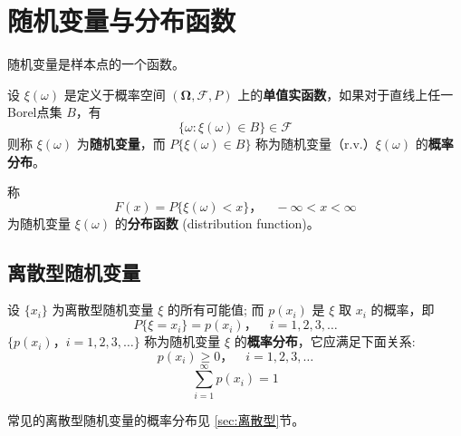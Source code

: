 \section{随机变量与分布函数}\label{sec:rvandcdf}
随机变量是样本点的一个函数。
\begin{definition}[随机变量] \label{def:random_variable}
设 $\xi(\omega)$ 是定义于概率空间 $(\boldsymbol{\Omega},\mathcal{F},P)$ 上的\textbf{单值实函数}，如果对于直线上任一Borel点集 $B$，有
\begin{equation} \label{eq:measurable_function_condition}
\{\omega:\xi(\omega) \in B\} \in \mathcal{F}
\end{equation}
则称 $\xi(\omega)$ 为\textbf{随机变量}，而 $P\{\xi(\omega) \in B\}$ 称为随机变量（r.v.）$\xi(\omega)$ 的\textbf{概率分布}。
\end{definition}
\begin{definition}[分布函数] \label{def:distribution_function}
称
\begin{equation} \label{eq:distribution_function_formula}
F(x) = P\{\xi(\omega) < x\}，\quad -\infty < x < \infty
\end{equation}
为随机变量 $\xi(\omega)$ 的\textbf{分布函数} (distribution function)。
\end{definition}
\subsection{离散型随机变量}
\begin{definition}[概率分布]\label{def:概率分布}
    设 $\{x_i\}$ 为离散型随机变量 $\xi$ 的所有可能值; 而 $p(x_i)$ 是 $\xi$ 取 $x_i$ 的概率，即
\begin{equation} \label{eq:discrete_prob_mass_function}
P\{ \xi=x_i \} = p(x_i)，\quad i=1,2,3,\ldots
\end{equation}
$\{p(x_i)，i=1,2,3,\ldots \}$ 称为随机变量 $\xi$ 的\textbf{概率分布}，它应满足下面关系:
\begin{equation} \label{eq:pmf_non_negative}
p(x_i) \ge 0，\quad i=1,2,3,\ldots
\end{equation}
\begin{equation} \label{eq:pmf_sum_to_one}
\sum_{i=1}^\infty p(x_i) = 1
\end{equation}
\end{definition}
\begin{remark}
    常见的离散型随机变量的概率分布见 \ref{sec:离散型}节。
\end{remark}
